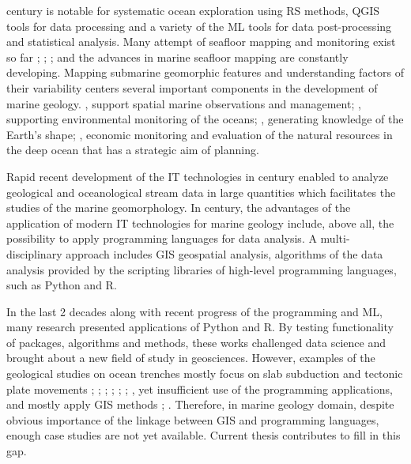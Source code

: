 \documentclass[11pt,a4paper]{report}
\begin{document}
 century is notable for systematic ocean exploration using \ac{RS} methods, \ac{QGIS} tools for data processing and a variety of the \ac{ML} tools for data post-processing and statistical analysis. Many attempt of seafloor mapping and monitoring exist so far \cite{Carronetal2013}; \cite{IHOIOC2012}; \cite{Lanieretal2007}; \cite{NormarkCarlson2003} and the advances in marine seafloor mapping are constantly developing. Mapping submarine geomorphic features and understanding factors of their variability centers several important components in the development of marine geology. , support spatial marine observations and management; , supporting environmental monitoring of the oceans; , generating knowledge of the Earth’s shape; , economic monitoring and evaluation of the natural resources in the deep ocean that has a strategic aim of planning. 

Rapid recent development of the \ac{IT} technologies in  century enabled to analyze geological and oceanological stream data in large quantities which facilitates the studies of the marine geomorphology. In  century, the advantages of the application of modern IT technologies for marine geology include, above all, the possibility to apply programming languages for data analysis. A multi-disciplinary approach includes \ac{GIS} geospatial analysis, algorithms of the data analysis provided by the scripting libraries of high-level programming languages, such as Python and R. 

In the last 2 decades along with recent progress of the programming and \ac{ML}, many research presented applications of Python and R. By testing functionality of packages, algorithms and methods, these works challenged data science and brought about a new field of study in geosciences. However, examples of the geological studies on ocean trenches mostly focus on slab subduction and tectonic plate movements \cite{Hall2002}; \cite{Bird2003}; \cite{JudgeMcNutt1991}; \cite{Halletal1995a}; \cite{BodineWatts1979}; \cite{HuangZhao2006}; \cite{Faccendaetal2009}, yet insufficient use of the programming applications, and mostly apply GIS methods \cite{Faccennaetal2007}; \cite{Liuetal2004}. Therefore, in marine geology domain, despite obvious importance of the linkage between GIS and programming languages, enough case studies are not yet available. Current thesis contributes to fill in this gap. 
\end{document}
